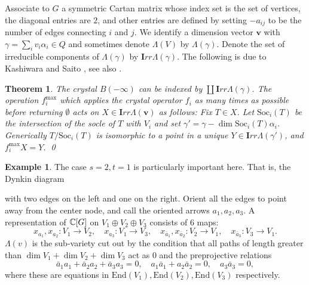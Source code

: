 \documentclass{amsart}
\numberwithin{equation}{section}
\numberwithin{figure}{section}
\numberwithin{table}{section}
\newtheorem{Theorem}[equation]{Theorem}
\theoremstyle{definition}
\newtheorem{Example}[equation]{Example}
\newcommand{\Irr}{{\bm Irr}}
\newcommand{\bfv}{{\bm v}}
\newcommand{\End}{\text{End}}
\begin{document}
Associate to $G$ a symmetric Cartan matrix whose index set is the set of vertices, the diagonal entries are $2$, and other entries are defined by setting $-a_{ij}$ to be the number of edges connecting $i$ and $j$. We identify a dimension vector $\bfv$ with $\gamma= \sum_i v_i \alpha_i \in Q$ and sometimes denote $\Lambda(V)$ by $\Lambda(\gamma)$. Denote the set of irreducible components of $\Lambda(\gamma)$ by $\Irr \Lambda (\gamma)$.
The following is due to Kashiwara and Saito \cite{KS:1997}, see also \cite[Proposition 3.14]{NT}.

\begin{Theorem} \label{th:QVrealization}
The crystal $B(-\infty)$ can be indexed by 
$\coprod \Irr \Lambda (\gamma)$. The operation $f_i^{\text{max}}$ which applies the crystal operator $f_i$ as many times as possible before returning $\emptyset$ acts on $X \in \Irr \Lambda (\bfv)$ as follows:
Fix $T \in X$. Let $\text{Soc}_i(T)$ be the intersection of the socle of $T$  with $V_i$ and set $\gamma'= \gamma-\dim \text{Soc}_i(T) \alpha_i$. Generically $T/{\text{Soc}_i}(T)$ is isomorphic to a point in a unique $Y \in \Irr \Lambda(\gamma')$, and $f_i^\text{max} X =Y$.   \qed
\end{Theorem}

\begin{Example}
The case $s=2,t=1$ is particularly important here. That is, the Dynkin diagram 
\begin{center}
\end{center}

\noindent with two edges on the left and one on the right. Orient all the edges to point away from the center node, and call  the oriented arrows $a_1,a_2,a_3$. 
A representation of ${\Bbb C}[G]$ on $V_1 \oplus V_2 \oplus V_3$ consists of 6 maps:
$$x_{a_1}, x_{a_2} : V_1 \rightarrow V_2, \quad x_{a_3}: V_1 \rightarrow V_3, \quad x_{\bar a_1}, x_{\bar a_2}: V_2 \rightarrow V_1, \quad x_{\bar a_3}: V_3 \rightarrow V_1.$$ 
$\Lambda(v)$ is the sub-variety cut out by the condition that all paths of length greater than $\dim V_1+\dim V_2+\dim V_3$ act as 0  and the preprojective relations
$$
\bar a_1 a_1+\bar a_2 a_2 +\bar a_3 a_3=0, \quad a_1 \bar a_1+ a_2 \bar a_2=0, \quad  a_3 \bar a_3=0 ,
$$
where these are equations in $\End (V_1), \End (V_2), \End(V_3)$ respectively. 
\end{Example}
\end{document}
